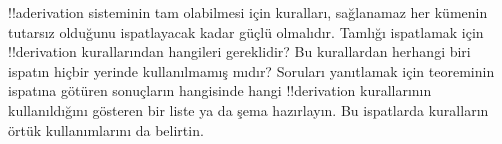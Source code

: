 \begin{prob}
!!a{derivation} sisteminin tam olabilmesi için kuralları, sağlanamaz
her kümenin tutarsız olduğunu ispatlayacak kadar güçlü olmalıdır.
Tamlığı ispatlamak için !!{derivation} kurallarından hangileri
gereklidir? Bu kurallardan herhangi biri ispatın hiçbir yerinde
kullanılmamış mıdır? Soruları yanıtlamak için
 teoreminin ispatına götüren
sonuçların hangisinde hangi !!{derivation} kurallarının kullanıldığını
gösteren bir liste ya da şema hazırlayın. Bu ispatlarda kuralların
örtük kullanımlarını da belirtin.
\end{prob}
\tagendprob

